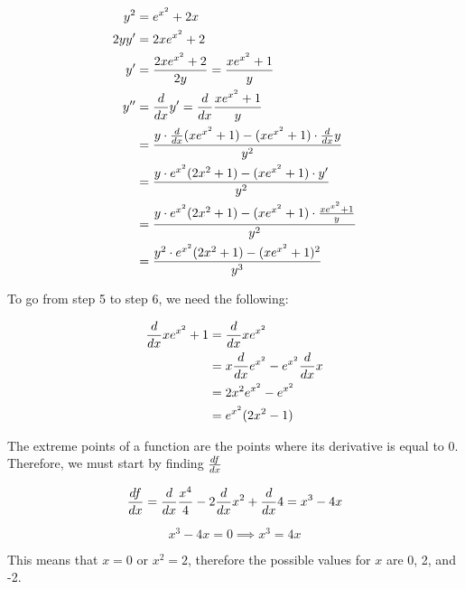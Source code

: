 \documentclass[12pt]{article} %
\begin{document}
\begin{homeworkProblem}

    \begin{align}
        y^2    & = e^{x^2} + 2x                                                                           \\
        2 y y' & = 2xe^{x^2} + 2                                                                          \\
        y '    & = \frac{2xe^{x^2} + 2}{2y} = \frac{xe^{x^2} + 1}{y}                                      \\
        y ''   & = \frac{d}{dx} y ' = \frac{d}{dx} \frac{xe^{x^2} + 1}{y}                                   \\
               & = \frac{y \cdot \frac{d}{dx} (xe^{x^2} + 1) - (xe^{x^2} + 1) \cdot \frac{d}{dx} y}{y ^ 2}  \\
               & = \frac{y \cdot e^{x^2} (2x^2 + 1) - (xe^{x^2} + 1) \cdot y '}{y ^ 2}                    \\
               & = \frac{y \cdot e^{x^2} (2x^2 + 1) - (xe^{x^2} + 1) \cdot \frac{xe^{x^2} + 1}{y}}{y ^ 2} \\
               & = \frac{y^2 \cdot e^{x^2} (2x^2 + 1) - (xe^{x^2} + 1)^2}{y ^ 3}
    \end{align}

    To go from step 5 to step 6, we need the following:

    \begin{align*}
        \frac{d}{dx} xe^{x^2} + 1
         & = \frac{d}{dx} xe^{x^2}                          \\
         & = x \frac{d}{dx} e^{x^2} - e^{x^2} \frac{d}{dx} x \\
         & = 2 x^2 e^{x^2} - e^{x^2}                       \\
         & = e^{x^2} (2x^2 - 1)
    \end{align*}

\end{homeworkProblem}
\pagebreak


\begin{homeworkProblem}

    The extreme points of a function are the points where its derivative is equal to 0. Therefore, we must start by finding $\frac{df}{dx}$

    $$
        \frac{df}{dx} = \frac{d}{dx} \frac{x^4}{4} - 2 \frac{d}{dx} x^2 + \frac{d}{dx} 4 = x^3 - 4x
    $$

    $$
        x^3 - 4x = 0 \implies x^3 = 4x
    $$

    This means that $x = 0$ or $x^2 = 2$, therefore the possible values for $x$ are 0, 2, and -2.
\end{homeworkProblem}
\end{document}
